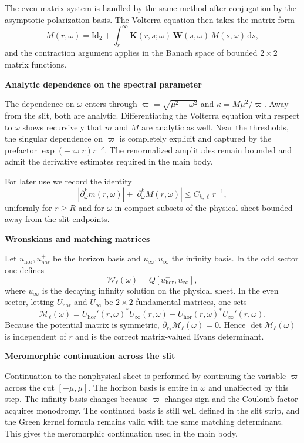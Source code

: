 \documentclass[12pt]{article}
\numberwithin{equation}{section}
\theoremstyle{plain}
\theoremstyle{definition}
\theoremstyle{remark}
\newcommand{\dd}{\mathrm d}
\newcommand{\hor}{\mathrm{hor}}
\newcommand{\cW}{\mathcal W}
\newcommand{\cM}{\mathcal M}
\newcommand{\om}{\omega}
\newcommand{\vp}{\varpi}
\newcommand{\kap}{\kappa}
\newcommand{\abs}[1]{\left|#1\right|}
\newcommand{\Id}{\mathrm{Id}}
\newcommand{\appheading}[1]{\par\medskip\noindent\textbf{#1}\par\smallskip\noindent}
\begin{document}
The even matrix system is handled by the same method after conjugation by the asymptotic polarization basis.  The Volterra equation then takes the matrix form
\[
   M(r,\om)=\Id_2+\int_r^\infty \mathbf K(r,s;\om)\,\mathbf W(s,\om)\,M(s,\om)\,\dd s,
\]
and the contraction argument applies in the Banach space of bounded $2\times2$ matrix functions.

\appheading{Analytic dependence on the spectral parameter}

The dependence on $\om$ enters through $\vp=\sqrt{\mu^2-\om^2}$ and $\kap=M\mu^2/\vp$.  Away from the slit, both are analytic.  Differentiating the Volterra equation with respect to $\om$ shows recursively that $m$ and $M$ are analytic as well.  Near the thresholds, the singular dependence on $\vp$ is completely explicit and captured by the prefactor $\exp(-\vp r)r^{-\kap}$.  The renormalized amplitudes remain bounded and admit the derivative estimates required in the main body.

For later use we record the identity
\begin{equation}\label{eq:app_om_derivative_bound}
   \abs{\partial_\om^k m(r,\om)}+\abs{\partial_\om^k M(r,\om)}
   \le C_{k,\ell}\,r^{-1},
\end{equation}
uniformly for $r\ge R$ and for $\om$ in compact subsets of the physical sheet bounded away from the slit endpoints.

\appheading{Wronskians and matching matrices}

Let $u_{\hor}^-,u_{\hor}^+$ be the horizon basis and $u_\infty^-,u_\infty^+$ the infinity basis.  In the odd sector one defines
\[
   \cW_\ell(\om)=Q[u_{\hor}^-,u_{\infty}],
\]
where $u_\infty$ is the decaying infinity solution on the physical sheet.  In the even sector, letting $U_{\hor}$ and $U_{\infty}$ be $2\times2$ fundamental matrices, one sets
\[
   \cM_\ell(\om)=U_{\hor}'(r,\om)^{*}U_{\infty}(r,\om)-U_{\hor}(r,\om)^{*}U_{\infty}'(r,\om).
\]
Because the potential matrix is symmetric, $\partial_{r_*}\cM_\ell(\om)=0$.  Hence $\det\cM_\ell(\om)$ is independent of $r$ and is the correct matrix-valued Evans determinant.

\appheading{Meromorphic continuation across the slit}

Continuation to the nonphysical sheet is performed by continuing the variable $\vp$ across the cut $[-\mu,\mu]$.  The horizon basis is entire in $\om$ and unaffected by this step.  The infinity basis changes because $\vp$ changes sign and the Coulomb factor acquires monodromy.  The continued basis is still well defined in the slit strip, and the Green kernel formula remains valid with the same matching determinant.  This gives the meromorphic continuation used in the main body.
\end{document}
